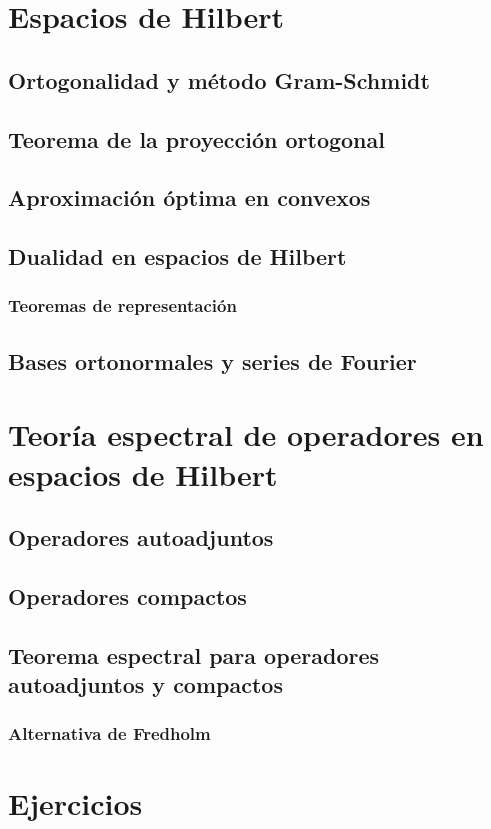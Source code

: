 \documentclass[bibnumbers, palatino]{apuntes}
\begin{document}
\chapter{Espacios de Hilbert}

\section{Ortogonalidad y método Gram-Schmidt}

\section{Teorema de la proyección ortogonal}

\section{Aproximación óptima en convexos}

\section{Dualidad en espacios de Hilbert}

\subsection{Teoremas de representación}

\section{Bases ortonormales y series de Fourier}

\chapter{Teoría espectral de operadores en espacios de Hilbert}

\section{Operadores autoadjuntos}

\section{Operadores compactos}

\section{Teorema espectral para operadores autoadjuntos y compactos}

\subsection{Alternativa de Fredholm}

\appendix

\chapter{Ejercicios}


\nocite{brezis2010functional,reed1980methods,rudin1991functional,ApuntesVarReal}
{}

\printindex
\end{document}
